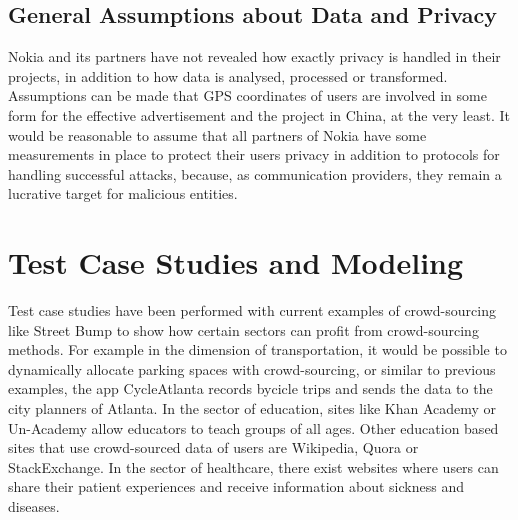 \documentclass[a4paper,12pt]{report}
\begin{document}
		\subsection{General Assumptions about Data and Privacy}
		\startsubsection
			Nokia and its partners have not revealed how exactly privacy is handled in their projects, in addition to how data is analysed, processed or transformed. 
			Assumptions can be made that GPS coordinates of users are involved in some form for the effective advertisement and the project in China, at the very least. 
			It would be reasonable to assume that all partners of Nokia have some measurements in place to protect their users privacy in addition to protocols for handling successful attacks, because, as communication providers, they remain a lucrative target for malicious entities.
		\closesection		
	\closesection
	
	\section[Test Case Studies and Modeling]{Test Case Studies and Modeling \cite{CrowdSourcing}}
	\startsection
		Test case studies have been performed with current examples of crowd-sourcing like Street Bump to show how certain sectors can profit from crowd-sourcing methods. 
		For example in the dimension of transportation, it would be possible to dynamically allocate parking spaces with crowd-sourcing, or similar to previous examples, the app CycleAtlanta records bycicle trips and sends the data to the city planners of Atlanta. 
		In the sector of education, sites like Khan Academy or Un-Academy allow educators to teach groups of all ages. 
		Other education based sites that use crowd-sourced data of users are Wikipedia, Quora or StackExchange. 
		In the sector of healthcare, there exist websites where users can share their patient experiences and receive information about sickness and diseases.
	\closesection
\end{document}
